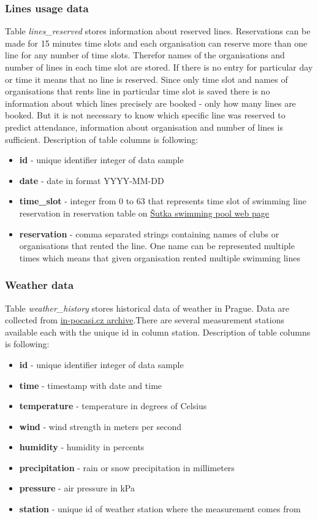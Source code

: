\documentclass{article}
\begin{document}
\subsubsection{Lines usage data} \label{sec:lines_usage}
Table \emph{lines\_reserved} stores information about reserved lines. Reservations can be made for 15 minutes time slots and each organisation can reserve more than one line for any number of time slots. Therefor names of the organisations and number of lines in each time slot are stored. If there is no entry for particular day or time it means that no line is reserved. Since only time slot and names of organisations that rents line in particular time slot is saved there is no information about which lines precisely are booked - only how many lines are booked. But it is not necessary to know which specific line was reserved to predict attendance, information about organisation and number of lines is sufficient. Description of table columns is following:
\begin{itemize}
    \item \textbf{id} - unique identifier integer of data sample
    \item \textbf{date} - date in format YYYY-MM-DD
    \item \textbf{time\_slot} - integer from 0 to 63 that represents time slot of swimming line reservation in reservation table on \href{https://www.sutka.eu/en/obsazenost-bazenu}{\v{S}utka swimming pool web page}
    \item \textbf{reservation} - comma separated strings containing names of clubs or organisations that rented the line. One name can be represented multiple times which means that given organisation rented multiple swimming lines
\end{itemize}

\subsubsection{Weather data}
Table \emph{weather\_history} stores historical data of weather in Prague. Data are collected from \href{https://www.in-pocasi.cz/archiv/}{in-pocasi.cz archive}.There are several measurement stations
available each with the unique id in column station. Description of table columns is following:
\begin{itemize}
    \item \textbf{id} - unique identifier integer of data sample
    \item \textbf{time} - timestamp with date and time
    \item \textbf{temperature} - temperature in degrees of Celsius
    \item \textbf{wind} - wind strength in meters per second
    \item \textbf{humidity} - humidity in percents
    \item \textbf{precipitation} - rain or snow precipitation in millimeters
    \item \textbf{pressure} - air pressure in kPa
    \item \textbf{station} - unique id of weather station where the measurement comes from
\end{itemize}
\end{document}
